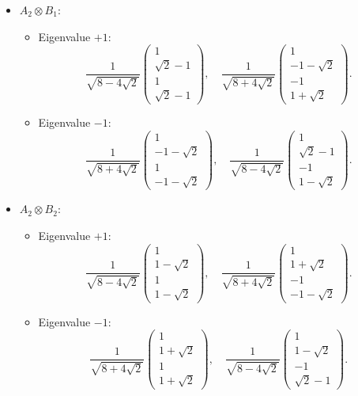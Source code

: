 \documentclass{article}
\begin{document}
\begin{itemize}
\begin{itemize}
\[        \]
    \end{itemize}
    \item \( A_2 \otimes B_1 \):
    \begin{itemize}
        \item Eigenvalue \( +1 \):
        \[
        \frac{1}{\sqrt{8-4\sqrt{2}}} \begin{pmatrix} 1 \\ \sqrt{2}-1 \\ 1 \\ \sqrt{2}-1 \end{pmatrix}, \quad \frac{1}{\sqrt{8+4\sqrt{2}}} \begin{pmatrix} 1 \\ -1-\sqrt{2} \\ -1 \\ 1+\sqrt{2} \end{pmatrix}.
        \]
        \item Eigenvalue \( -1 \):
        \[
        \frac{1}{\sqrt{8+4\sqrt{2}}} \begin{pmatrix} 1 \\ -1-\sqrt{2} \\ 1 \\ -1-\sqrt{2} \end{pmatrix}, \quad \frac{1}{\sqrt{8-4\sqrt{2}}} \begin{pmatrix} 1 \\ \sqrt{2}-1 \\ -1 \\ 1-\sqrt{2} \end{pmatrix}.
        \]
    \end{itemize}
    \item \( A_2 \otimes B_2 \):
    \begin{itemize}
        \item Eigenvalue \( +1 \):
        \[
        \frac{1}{\sqrt{8-4\sqrt{2}}} \begin{pmatrix} 1 \\ 1-\sqrt{2} \\ 1 \\ 1-\sqrt{2} \end{pmatrix}, \quad \frac{1}{\sqrt{8+4\sqrt{2}}} \begin{pmatrix} 1 \\ 1+\sqrt{2} \\ -1 \\ -1-\sqrt{2} \end{pmatrix}.
        \]
        \item Eigenvalue \( -1 \):
        \[
        \frac{1}{\sqrt{8+4\sqrt{2}}} \begin{pmatrix} 1 \\ 1+\sqrt{2} \\ 1 \\ 1+\sqrt{2} \end{pmatrix}, \quad \frac{1}{\sqrt{8-4\sqrt{2}}} \begin{pmatrix} 1 \\ 1-\sqrt{2} \\ -1 \\ \sqrt{2}-1 \end{pmatrix}.
        \]
    \end{itemize}
\end{itemize}
\end{document}
